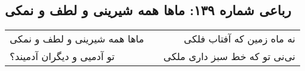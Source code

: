 \begin{center}
\section*{رباعی شماره ۱۳۹: ماها همه شیرینی و لطف و نمکی}
\label{sec:139}
\begin{longtable}{l p{0.5cm} r}
ماها همه شیرینی و لطف و نمکی
&&
نه ماه زمین که آفتاب فلکی
\\
تو آدمیی و دیگران آدمیند؟
&&
نی‌نی تو که خط سبز داری ملکی
\\
\end{longtable}
\end{center}
